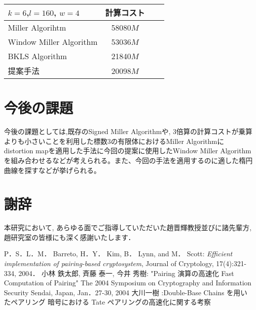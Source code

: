 \documentclass[twocolumn]{jsarticle} %
\begin{document}
\begin{table}[htbp]
 \begin{center}
  \begin{tabular}{|l|c|c|c|}
  \hline
  $k=6$,$l=160$, $w=4$ & 計算コスト \\
  \hline
  Miller Algorihtm & 58080$M$ \\
  \hline
  Window Miller Algorithm & 53036$M$ \\
  \hline
  BKLS Algorithm &  21840$M$ \\
  \hline
  提案手法 & 20098$M$ \\
  \hline
  \end{tabular}
 \end{center}
\end{table}
\vspace{-2zh}
\section{今後の課題}
今後の課題としては,既存のSigned Miller Algorithmや, 3倍算の計算コストが乗算よりも小さいことを利用した標数3の有限体におけるMiller Algorithmにdistortion mapを適用した手法に今回の提案に使用したWindow Miller Algorithmを組み合わせるなどが考えられる。また、今回の手法を適用するのに適した楕円曲線を探すなどが挙げられる。
\section*{謝辞}
本研究において, あらゆる面でご指導していただいた趙晋輝教授並びに諸先輩方, 趙研究室の皆様にも深く感謝いたします．

\begin{thebibliography}{99}
 P．S．L．M． Barreto, H．Y． Kim, B． Lynn, and M． Scott: {\em Efficient implementation of pairing-based cryptosystem}, Journal of Cryptology, 17(4):321-334, 2004．
 小林 鉄太郎, 斉藤 泰一, 今井 秀樹: "Pairing 演算の高速化 Fast Computation of Pairing" The 2004 Symposium on Cryptography and Information Security Sendai, Japan, Jan．27-30, 2004
大川一樹 :Double-Base Chains を用いたペアリング 暗号における Tate ペアリングの高速化に関する考察

\end{thebibliography}

\end{document}
